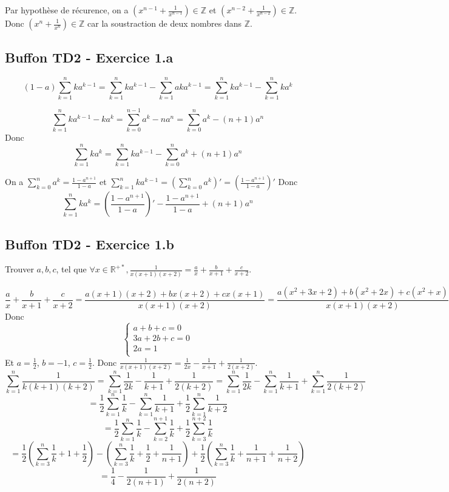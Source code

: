 \documentclass[]{book}
\theoremstyle{definition}
\newcommand{\bb}[1]{\mathbb{#1}}
\newcommand{\Z}{\bb{Z}}
\newcommand{\R}{\bb{R}}
\begin{document}
Par hypoth\`ese de r\'ecurence, on a $\left( x^{n-1} + \frac{1}{x^{n-1}} \right) \in \Z$ et $\left( x^{n-2} + \frac{1}{x^{n-2}} \right) \in \Z$. Donc $\left( x^{n} + \frac{1}{x^{n}} \right) \in \Z$ car la soustraction de deux nombres dans $\Z$.



\newpage
\subsection*{Buffon TD2 - Exercice 1.a}
$$(1-a)\sum_{k=1}^{n}ka^{k-1} = \sum_{k=1}^{n}ka^{k-1} - \sum_{k=1}^{n}aka^{k-1} = \sum_{k=1}^{n}ka^{k-1} - \sum_{k=1}^{n}ka^{k}$$

$$\sum_{k=1}^{n}{ka^{k-1} - ka^{k}} = \sum_{k=0}^{n-1}{a^k} - na^{n} = \sum_{k=0}^{n}{a^k} - (n+1)a^{n}$$
Donc
$$\sum_{k=1}^{n}ka^{k} = \sum_{k=1}^{n}ka^{k-1} - \sum_{k=0}^{n}{a^k} + (n+1)a^{n}$$

On a $\sum_{k=0}^{n}{a^k} = \frac{1-a^{n+1}}{1-a}$ et $\sum_{k=1}^{n}ka^{k-1} = \left( \sum_{k=0}^{n}{a^k} \right)' = \left( \frac{1-a^{n+1}}{1-a} \right)'$
Donc
$$\sum_{k=1}^{n}ka^{k} = \left( \frac{1-a^{n+1}}{1-a} \right)' - \frac{1-a^{n+1}}{1-a} + (n+1)a^{n} $$

\subsection*{Buffon TD2 - Exercice 1.b}
Trouver $a,b,c$, tel que $\forall x \in \R^{+*},\frac{1}{x(x+1)(x+2)} = \frac{a}{x}+ \frac{b}{x+1}+ \frac{c}{x+2}$.

$$\frac{a}{x}+ \frac{b}{x+1}+ \frac{c}{x+2} = \frac{a(x+1)(x+2)+bx(x+2)+cx(x+1)}{x(x+1)(x+2)} = \frac{a(x^2+3x+2)+b(x^2+2x)+c(x^2+x)}{x(x+1)(x+2)}$$
Donc 
$$
\left\{ 
\begin{array}{l}
a+b+c = 0 \\
3a+2b+c = 0 \\
2a = 1 \\
\end{array}
\right. 
$$
Et $a=\frac{1}{2}$, $b=-1$, $c=\frac{1}{2}$. Donc $\frac{1}{x(x+1)(x+2)} = \frac{1}{2x} - \frac{1}{x+1} + \frac{1}{2(x+2)}$.\\
$$\sum_{k=1}^{n}{\frac{1}{k(k+1)(k+2)}} = \sum_{k=1}^{n}{\frac{1}{2k} - \frac{1}{k+1} + \frac{1}{2(k+2)}} = \sum_{k=1}^{n}{\frac{1}{2k}} - \sum_{k=1}^{n}{\frac{1}{k+1}} + \sum_{k=1}^{n}{\frac{1}{2(k+2)}}$$
$$ = \frac{1}{2}\sum_{k=1}^{n}{\frac{1}{k}} - \sum_{k=1}^{n}{\frac{1}{k+1}} + \frac{1}{2}\sum_{k=1}^{n}{\frac{1}{k+2}}$$
$$ = \frac{1}{2}\sum_{k=1}^{n}{\frac{1}{k}} - \sum_{k=2}^{n+1}{\frac{1}{k}} + \frac{1}{2}\sum_{k=3}^{n+2}{\frac{1}{k}}$$
$$ = \frac{1}{2}(\sum_{k=3}^{n}{\frac{1}{k}}+1+\frac{1}{2}) - (\sum_{k=3}^{n}{\frac{1}{k}}+\frac{1}{2}+\frac{1}{n+1}) + \frac{1}{2}(\sum_{k=3}^{n}{\frac{1}{k}}+\frac{1}{n+1}+\frac{1}{n+2})$$
$$=\frac{1}{4}-\frac{1}{2(n+1)}+\frac{1}{2(n+2)}$$
\end{document}
